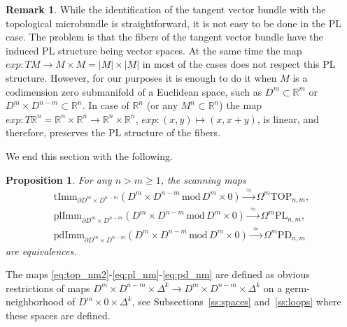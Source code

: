 \documentclass[11pt]{amsart}
\newtheorem{proposition}[theorem]{Proposition}
\theoremstyle{definition}
\newtheorem{remark}[theorem]{Remark}
\newcommand{\R}{{\mathbb R}}
\newcommand{\tImm}{\mathrm{tImm}}
\newcommand{\plImm}{\mathrm{plImm}}
\newcommand{\pdImm}{\mathrm{pdImm}}
\newcommand{\PL}{\mathrm{PL}}
\newcommand{\TOP}{\mathrm{TOP}}
\newcommand{\PD}{\mathrm{PD}}
\newcommand{\mmod}{\,\mathrm{mod}\,}
\numberwithin{equation}{section}
\begin{document}
\begin{remark}\label{r:exp} 
While  the identification of the tangent vector bundle with the topological microbundle is straightforward, it is not easy to be done in the
PL case. The problem is that the fibers of the tangent vector bundle have the induced PL structure being vector spaces. At the same time the 
map $exp\colon TM\to M\times M=|M|\times |M|$ in most of the cases does not respect this PL structure. However, for our purposes it is enough to 
do it when $M$ is a codimension zero submanifold of a Euclidean space, such as $D^m\subset\R^m$ or $D^m\times D^{n-m}\subset\R^n$. In case of $\R^n$ (or any $M^n\subset \R^n$) the map
$exp:T\R^n=\R^n\times\R^n\to \R^n\times\R^n$, $exp\colon (x,y)\mapsto (x,x+y)$, is linear, and therefore, preserves the PL structure of the fibers.
\end{remark}

We end this section with the following.

\begin{proposition}\label{p:top_nm}
For any $n>m\geq 1$, the  scanning maps
\begin{gather}
\tImm_{\partial D^m\times D^{n-m}}(D^m\times D^{n-m}\mmod D^m\times 0)\xrightarrow{\,\,\simeq\,\,} \Omega^m\TOP_{n,m},\label{eq:top_nm2}\\
\plImm_{\partial D^m\times D^{n-m}}(D^m\times D^{n-m}\mmod D^m\times 0)\xrightarrow{\,\,\simeq\,\,} \Omega^m\PL_{n,m},\label{eq:pl_nm}\\
\pdImm_{\partial D^m\times D^{n-m}}(D^m\times D^{n-m}\mmod D^m\times 0)\xrightarrow{\,\,\simeq\,\,} \Omega^m\PD_{n,m}\label{eq:pd_nm}
\end{gather}
are equivalences.
\end{proposition}

The maps \eqref{eq:top_nm2}-\eqref{eq:pl_nm}-\eqref{eq:pd_nm} are defined as obvious restrictions of maps $D^m\times D^{n-m}\times\Delta^k\to D^m\times
 D^{n-m}\times\Delta^k$ on a
germ-neighborhood of $D^m\times 0\times\Delta^k$, see Subsections~\ref{ss:spaces} and~\ref{ss:loops} where these
spaces are defined.
%
\end{document}

